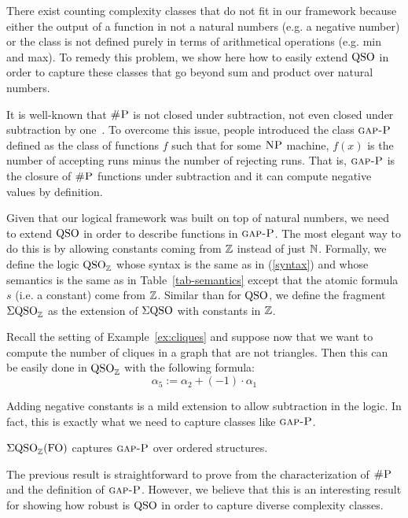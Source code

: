 There exist counting complexity classes that do not fit in our framework because either the output of a function in not a natural numbers (e.g. a negative number) or the class is not defined purely in terms of arithmetical operations (e.g. min and max).
To remedy this problem, we show here how to easily extend ${\rm QSO}$ in order to capture these classes that go beyond sum and product over natural numbers. 

It is well-known that $\text{\sc \#P}$ is not closed under subtraction, not even closed under subtraction by one~\cite{OH93}.
To overcome this issue, people introduced the class $\text{\sc gap-P}$~\cite{fenner1994gap} defined as the class of functions $f$ such that for some $\text{\sc NP}$ machine, $f(x)$ is the number of accepting runs minus the number of rejecting runs.
That is, $\text{\sc gap-P}$ is the closure of $\text{\sc \#P}$ functions under subtraction and it can compute negative values by definition. 

Given that our logical framework was built on top of natural numbers, we need to extend ${\rm QSO}$ in order to describe functions in $\text{\sc gap-P}$. 
The most elegant way to do this is by allowing constants coming from $\mathbb{Z}$ instead of just $\mathbb{N}$. 
Formally, we define the logic ${\rm QSO}_{\mathbb{Z}}$ whose syntax is the same as in (\ref{syntax}) and whose semantics is the same as in Table~\ref{tab-semantics} except that the atomic formula $s$ (i.e. a constant) come from $\mathbb{Z}$.  
Similar than for ${\rm QSO}$, we define the fragment $\Sigma{\rm QSO}_{\mathbb{Z}}$ as the extension of $\Sigma{\rm QSO}$ with constants in $\mathbb{Z}$.
\begin{example}
	Recall the setting of Example~\ref{ex:cliques} and suppose now that we want to compute the number of cliques in a graph that are not triangles. Then this can be easily done in ${\rm QSO}_{\mathbb{Z}}$ with the following formula:
	\[
	\alpha_5 :=	\alpha_2 + (-1) \cdot \alpha_1 
	\]
\end{example}
Adding negative constants is a mild extension to allow subtraction in the logic. 
In fact, this is exactly what we need to capture classes like $\text{\sc gap-P}$.
\begin{proposition} \label{prop:capture-gapp}
	$\Sigma{\rm QSO}_{\mathbb{Z}}({\rm FO})$ captures $\text{\sc gap-P}$ over ordered structures.
\end{proposition}
The previous result is straightforward to prove from the characterization of $\text{\sc \#P}$ and the definition of $\text{\sc gap-P}$. 
However, we believe that this is an interesting result for showing how robust is ${\rm QSO}$ in order to capture diverse complexity classes.


